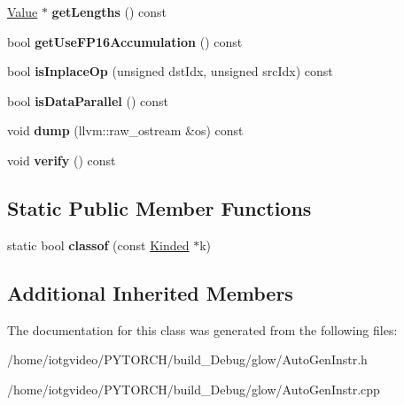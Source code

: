\begin{DoxyCompactItemize}
\hyperlink{classglow_1_1_value}{Value} $\ast$ {\bfseries get\+Lengths} () const
\item 
\mbox{\label{classglow_1_1_fused_rowwise_quantized_sparse_lengths_weighted_sum_inst_a66cd43438979983a10cccc4eafe2f5a6}} 
bool {\bfseries get\+Use\+F\+P16\+Accumulation} () const
\item 
\mbox{\label{classglow_1_1_fused_rowwise_quantized_sparse_lengths_weighted_sum_inst_a6e5675de28013694f2cce4f3c6f72b63}} 
bool {\bfseries is\+Inplace\+Op} (unsigned dst\+Idx, unsigned src\+Idx) const
\item 
\mbox{\label{classglow_1_1_fused_rowwise_quantized_sparse_lengths_weighted_sum_inst_a58c5c49c98aac0a9f840e22cc4b8bf5f}} 
bool {\bfseries is\+Data\+Parallel} () const
\item 
\mbox{\label{classglow_1_1_fused_rowwise_quantized_sparse_lengths_weighted_sum_inst_ad061ed510132e26cfee2f13aa5e145f5}} 
void {\bfseries dump} (llvm\+::raw\+\_\+ostream \&os) const
\item 
\mbox{\label{classglow_1_1_fused_rowwise_quantized_sparse_lengths_weighted_sum_inst_a99c415fcbf4ab2e0481c52aab6678b18}} 
void {\bfseries verify} () const
\end{DoxyCompactItemize}
\subsection*{Static Public Member Functions}
\begin{DoxyCompactItemize}
\item 
\mbox{\label{classglow_1_1_fused_rowwise_quantized_sparse_lengths_weighted_sum_inst_a772f0756dc7e07ba802f9008cdb4ac3f}} 
static bool {\bfseries classof} (const \hyperlink{classglow_1_1_kinded}{Kinded} $\ast$k)
\end{DoxyCompactItemize}
\subsection*{Additional Inherited Members}


The documentation for this class was generated from the following files\+:\begin{DoxyCompactItemize}
\item 
/home/iotgvideo/\+P\+Y\+T\+O\+R\+C\+H/build\+\_\+\+Debug/glow/Auto\+Gen\+Instr.\+h\item 
/home/iotgvideo/\+P\+Y\+T\+O\+R\+C\+H/build\+\_\+\+Debug/glow/Auto\+Gen\+Instr.\+cpp\end{DoxyCompactItemize}
